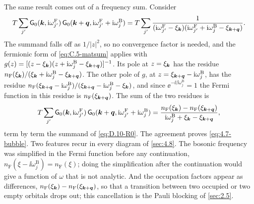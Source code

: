 The same result comes out of a frequency sum. Consider
\begin{equation*}
  T\sum_{j'}\mathsf{G}_0(\bm{k},\mathrm{i}\omega^{\mathrm{F}}_{j'})\,\mathsf{G}_0(\bm{k} + \bm{q},\mathrm{i}\omega^{\mathrm{F}}_{j'} + \mathrm{i}\omega^{\mathrm{B}}_j)
  = T\sum_{j'}\frac{1}{(\mathrm{i}\omega^{\mathrm{F}}_{j'} - \xi_{\bm{k}})(\mathrm{i}\omega^{\mathrm{F}}_{j'} + \mathrm{i}\omega^{\mathrm{B}}_j - \xi_{\bm{k}+\bm{q}})} .
\end{equation*}
The summand falls off as $1/|z|^2$, so no convergence factor is needed, and the fermionic form of \cref{eq:C.5-matsum} applies with $g(z) = [(z - \xi_{\bm{k}})(z + \mathrm{i}\omega^{\mathrm{B}}_j - \xi_{\bm{k}+\bm{q}})]^{-1}$. Its pole at $z = \xi_{\bm{k}}$ has the residue $n_{\mathrm{F}}(\xi_{\bm{k}})/(\xi_{\bm{k}} + \mathrm{i}\omega^{\mathrm{B}}_j - \xi_{\bm{k}+\bm{q}})$. The other pole of $g$, at $z = \xi_{\bm{k}+\bm{q}} - \mathrm{i}\omega^{\mathrm{B}}_j$, has the residue $n_{\mathrm{F}}(\xi_{\bm{k}+\bm{q}} - \mathrm{i}\omega^{\mathrm{B}}_j)/(\xi_{\bm{k}+\bm{q}} - \mathrm{i}\omega^{\mathrm{B}}_j - \xi_{\bm{k}})$, and since $\ee^{-\ii\beta\omega^{\mathrm{B}}_j} = 1$ the Fermi function in this residue is $n_{\mathrm{F}}(\xi_{\bm{k}+\bm{q}})$. The sum of the two residues is
\begin{equation}
  T\sum_{j'}\mathsf{G}_0(\bm{k},\mathrm{i}\omega^{\mathrm{F}}_{j'})\,\mathsf{G}_0(\bm{k} + \bm{q},\mathrm{i}\omega^{\mathrm{F}}_{j'} + \mathrm{i}\omega^{\mathrm{B}}_j)
  = \frac{n_{\mathrm{F}}(\xi_{\bm{k}}) - n_{\mathrm{F}}(\xi_{\bm{k}+\bm{q}})}{\mathrm{i}\omega^{\mathrm{B}}_j + \xi_{\bm{k}} - \xi_{\bm{k}+\bm{q}}} ,
  \label{eq:D.10-sum}
\end{equation}
term by term the summand of \cref{eq:D.10-R0}. The agreement proves \cref{eq:4.7-bubble}. Two features recur in every diagram of \cref{sec:4.8}. The bosonic frequency was simplified in the Fermi function before any continuation, $n_{\mathrm{F}}(\xi - \ii\omega^{\mathrm{B}}_j) = n_{\mathrm{F}}(\xi)$; doing the simplification after the continuation would give a function of $\omega$ that is not analytic. And the occupation factors appear as differences, $n_{\mathrm{F}}(\xi_{\bm{k}}) - n_{\mathrm{F}}(\xi_{\bm{k}+\bm{q}})$, so that a transition between two occupied or two empty orbitals drops out; this cancellation is the Pauli blocking of \cref{sec:2.5}.
